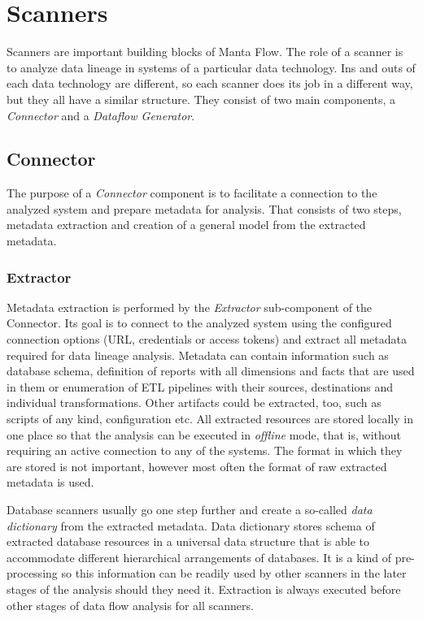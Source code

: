 \section{Scanners}

Scanners are important building blocks of Manta Flow. The role of a scanner is to analyze data lineage in systems of a particular data technology. Ins and outs of each data technology are different, so each scanner does its job in a different way, but they all have a similar structure. They consist of two main components, a \textit{Connector} and a \textit{Dataflow Generator}.

\subsection{Connector}

The purpose of a \textit{Connector} component is to facilitate a connection to the analyzed system and prepare metadata for analysis. That consists of two steps, metadata extraction and creation of a general model from the extracted metadata. 

\subsubsection{Extractor}

Metadata extraction is performed by the \textit{Extractor} sub-component of the Connector. Its goal is to connect to the analyzed system using the configured connection options (URL, credentials or access tokens) and extract all metadata required for data lineage analysis. Metadata can contain information such as database schema, definition of reports with all dimensions and facts that are used in them or enumeration of ETL pipelines with their sources, destinations and individual transformations. Other artifacts could be extracted, too, such as scripts of any kind, configuration etc. All extracted resources are stored locally in one place so that the analysis can be executed in \textit{offline} mode, that is, without requiring an active connection to any of the systems. The format in which they are stored is not important, however most often the format of raw extracted metadata is used.
\par
Database scanners usually go one step further and create a so-called \textit{data dictionary} from the extracted metadata. Data dictionary stores schema of extracted database resources in a universal data structure that is able to accommodate different hierarchical arrangements of databases. It is a kind of pre-processing so this information can be readily used by other scanners in the later stages of the analysis should they need it. Extraction is always executed before other stages of data flow analysis for all scanners. 

